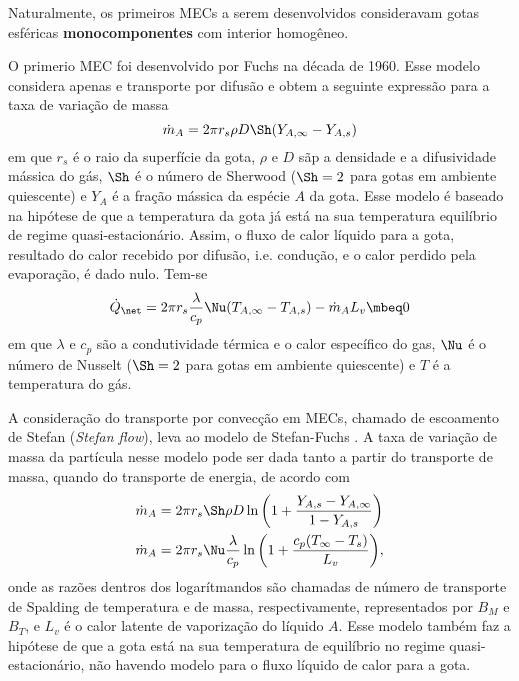 Naturalmente, os primeiros MECs a serem desenvolvidos consideravam gotas esféricas \textbf{monocomponentes} com interior homogêneo.

O primerio MEC foi desenvolvido por Fuchs \cite{Fuchs1959} na década de 1960. 
Esse modelo considera apenas e transporte por difusão e obtem a seguinte expressão para a taxa de variação de massa
\begin{equation}
    \dot m_A = 2 \pi r_s \rho D \Sh (Y_{A,\infty} - Y_{A,s}) \label{eq:maxwell}
\end{equation}
em que $r_s$ é o raio da superfície da gota, $\rho$ e $D$ sãp a densidade e a difusividade mássica do gás, $\Sh$ é o número de Sherwood ($\Sh=2$ para gotas em ambiente quiescente) e $Y_A$ é a fração mássica da espécie $A$ da gota.
Esse modelo é baseado na hipótese de que a temperatura da gota já está na sua temperatura equilíbrio de regime quasi-estacionário.
Assim, o fluxo de calor líquido para a gota, resultado do calor recebido por  difusão, i.e. condução, e o calor perdido pela evaporação, é dado nulo.
Tem-se
\begin{equation}
    \dot Q_\net = 2 \pi r_s \frac{\lambda}{c_p} \Nu (T_{A,\infty} - T_{A,s}) - \dot m_A L_v \mbeq 0
    \label{eq:maxwell_T}
\end{equation}
em que $\lambda$ e $c_p$ são a condutividade térmica e o calor específico do gas, $\Nu$ é o número de Nusselt ($\Sh=2$ para gotas em ambiente quiescente) e $T$ é a temperatura do gás.

A consideração do transporte por convecção em MECs, chamado de escoamento de Stefan (\emph{Stefan flow}), leva ao modelo de Stefan-Fuchs \cite{Law1978}.
A taxa de variação de massa da partícula nesse modelo pode ser dada tanto a partir do transporte de massa, quando do transporte de energia, de acordo com
\begin{align}
    \dot m_{A} &= 2 \pi r_s \Sh \rho D 
        \ln{\left(1 + \frac{Y_{A,s} - Y_{A,\infty}}{1 - Y_{A,s}}\right)}
        \label{eq:m_evap_BM} \\
    \dot m_A   &= 2 \pi r_s \Nu \frac{\lambda}{c_p} 
        \ln{\left(1 + \frac{c_p (T_\infty - T_s)}{L_v}\right)}, 
        \label{eq:m_evap_BT}
\end{align}
onde as razões dentros dos logarítmandos são chamadas de número de transporte de Spalding de temperatura e de massa, respectivamente, representados por $B_M$ e $B_T$, e $L_v$ é o calor latente de vaporização do líquido $A$.
Esse modelo também faz a hipótese de que a gota está na sua temperatura de equilíbrio no regime quasi-estacionário, não havendo modelo para o fluxo líquido de calor para a gota.

